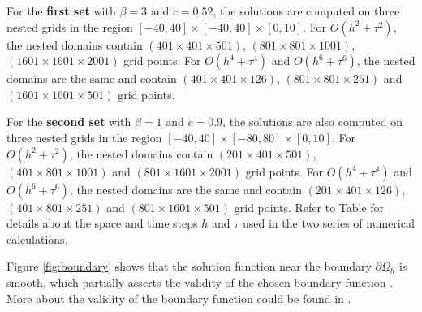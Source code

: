 \documentclass[11pt,a4paper,twoside]{article}
\begin{document}
For the \textbf{first set} with {\boldmath$\beta = 3$} and {\boldmath$c=0.52$}, the solutions are computed on three nested grids in the region $[-40, 40] \times [-40, 40] \times [0, 10]$. 
	For $O(h^2 + \tau^2)$, the nested domains contain $(401 \times 401 \times 501)$,  $(801 \times 801  \times 1001)$, $(1601 \times 1601  \times 2001)$  grid points.
	For $O(h^4 + \tau^4)$ and $O(h^6 + \tau^6)$, the nested domains are the same and contain $(401 \times 401 \times 126)$,  $(801 \times 801 \times 251)$ and $(1601 \times 1601 \times 501)$ grid points. 

For the \textbf{second set} with {\boldmath$\beta = 1$} and {\boldmath$c=0.9$}, the solutions are also computed on three nested  grids in the region $[-40, 40] \times [-80, 80]\times [0, 10]$. 
	For $O(h^2 + \tau^2)$, the nested domains contain $(201 \times 401 \times 501)$,  $(401 \times 801 \times 1001)$ and $(801 \times 1601 \times 2001)$ grid points.
	 For $O(h^4 + \tau^4)$ and $O(h^6 + \tau^6)$, the nested domains are the same and contain $(201 \times 401 \times 126)$,  $(401 \times 801 \times 251)$ and $(801 \times 1601 \times 501)$ grid points. Refer to Table  for details about the space and time steps $h$ and $\tau$ used in the two series  of numerical calculations.

\iffalse
Figure \ref{fig:boundary} shows that the solution function near the boundary $\partial \Omega_h$ is smooth, which partially asserts the validity of the chosen boundary function . More about the validity of the boundary function could be found in \cite{BoundaryProblem}. 
\end{document}
